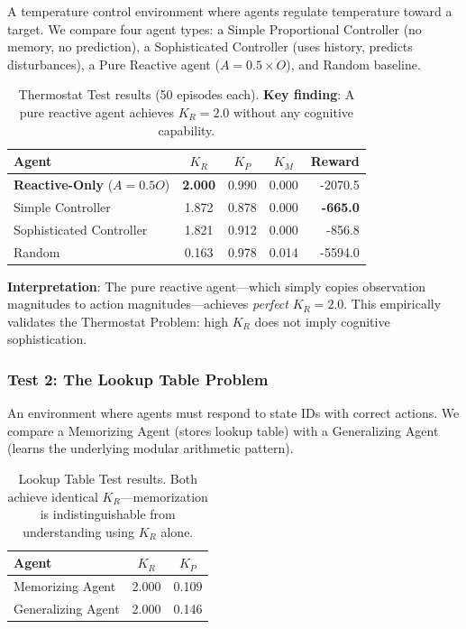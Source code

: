 \documentclass[11pt,a4paper]{article}
\newcommand{\kr}{K_R}
\newcommand{\kp}{K_P}
\newcommand{\km}{K_M}
\begin{document}
A temperature control environment where agents regulate temperature toward a target. We compare four agent types: a Simple Proportional Controller (no memory, no prediction), a Sophisticated Controller (uses history, predicts disturbances), a Pure Reactive agent ($A = 0.5 \times O$), and Random baseline.

\begin{table}[h]
\centering
\begin{tabular}{lcccr}
\toprule
\textbf{Agent} & $\kr$ & $\kp$ & $\km$ & \textbf{Reward} \\
\midrule
\textbf{Reactive-Only} ($A = 0.5O$) & \textbf{2.000} & 0.990 & 0.000 & -2070.5 \\
Simple Controller & 1.872 & 0.878 & 0.000 & \textbf{-665.0} \\
Sophisticated Controller & 1.821 & 0.912 & 0.000 & -856.8 \\
Random & 0.163 & 0.978 & 0.014 & -5594.0 \\
\bottomrule
\end{tabular}
\caption{Thermostat Test results (50 episodes each). \textbf{Key finding}: A pure reactive agent achieves $K_R = 2.0$ without any cognitive capability.}
\label{tab:thermostat}
\end{table}

\textbf{Interpretation}: The pure reactive agent---which simply copies observation magnitudes to action magnitudes---achieves \emph{perfect} $K_R = 2.0$. This empirically validates the Thermostat Problem: high $K_R$ does not imply cognitive sophistication.

\subsubsection{Test 2: The Lookup Table Problem}

An environment where agents must respond to state IDs with correct actions. We compare a Memorizing Agent (stores lookup table) with a Generalizing Agent (learns the underlying modular arithmetic pattern).

\begin{table}[h]
\centering
\begin{tabular}{lcc}
\toprule
\textbf{Agent} & $\kr$ & $\kp$ \\
\midrule
Memorizing Agent & 2.000 & 0.109 \\
Generalizing Agent & 2.000 & 0.146 \\
\bottomrule
\end{tabular}
\caption{Lookup Table Test results. Both achieve identical $K_R$---memorization is indistinguishable from understanding using $K_R$ alone.}
\label{tab:lookup}
\end{table}
\end{document}
